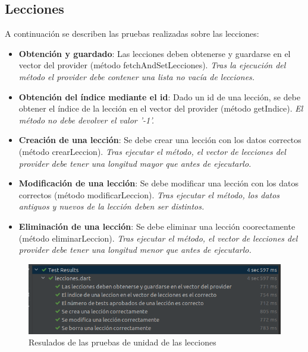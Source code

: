 \subsection{Lecciones}
\label{subsec:pruebas-unidad-lecciones}
A continuación se describen las pruebas realizadas sobre las lecciones:
\begin{itemize}
    \item \textbf{Obtención y guardado}: Las lecciones deben obtenerse y guardarse en el vector del provider (método fetchAndSetLecciones). \textit{Tras la ejecución del método el provider debe contener una lista no vacía de lecciones.} 
    \item \textbf{Obtención del índice mediante el id}: Dado un id de una lección, se debe obtener el índice de la lección en el vector del provider (método getIndice). \textit{El método no debe devolver el valor '-1'.}
    \item \textbf{Creación de una lección}: Se debe crear una lección con los datos correctos (método crearLeccion). \textit{Tras ejecutar el método, el vector de lecciones del provider debe tener una longitud mayor que antes de ejecutarlo.}
    \item \textbf{Modificación de una lección}: Se debe modificar una lección con los datos correctos (método modificarLeccion). \textit{Tras ejecutar el método, los datos antiguos y nuevos de la lección deben ser distintos.}
    \item \textbf{Eliminación de una lección}: Se debe eliminar una lección coorectamente (método eliminarLeccion). \textit{Tras ejecutar el método, el vector de lecciones del provider debe tener una longitud menor que antes de ejecutarlo.}
\end{itemize}

\begin{figure}[H]
    \centering
    \includegraphics[width=\textwidth]{imagenes/c8/pruebalecciones.png}
    \caption{Resulados de las pruebas de unidad de las lecciones}
    \label{fig:pruebas_unidad_lecciones}
\end{figure}


